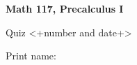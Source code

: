 
\begin{minipage}{.3\textwidth}
  \centerline{\bf Math 117, Precalculus I}
  \medskip
  \centerline{Quiz <+number and date+>}
\end{minipage}%
\begin{minipage}{.7\textwidth}
  \hfill\large {} \hfill \else Print name:\enspace\hrulefill \fi
  \medskip
\end{minipage}
